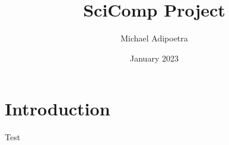 \documentclass{article}
\title{SciComp Project}
\author{Michael Adipoetra}
\date{January 2023}
\begin{document}
\maketitle

\section{Introduction}
    Test
\end{document}
